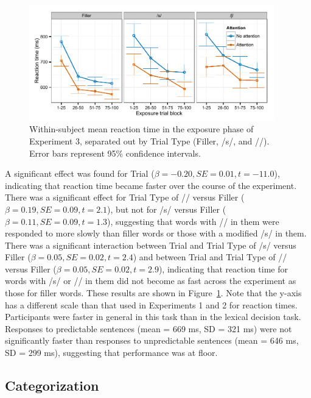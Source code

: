\begin{figure}[!ht]
\centering
\caption{Within-subject mean reaction time in the exposure phase of Experiment 3, separated out by Trial Type (Filler, /s/, and /\textesh/). Error bars represent 95\% confidence intervals.}
\label{fig:exp3exposert}
\begin{center}
\includegraphics[width=0.95\textwidth]{graphs/exp3_exprt}
\end{center}
\end{figure}

A significant effect was found for Trial ($\beta = -0.20, SE = 0.01, t = -11.0$), indicating that reaction time became faster over the course of the experiment.
There was a significant effect for Trial Type of /\textesh/ versus Filler ($\beta = 0.19, SE = 0.09, t = 2.1$), but not for /s/ versus Filler ($\beta = 0.11, SE = 0.09, t = 1.3$), suggesting that words with /\textesh/ in them were responded to more slowly than filler words or those with a modified /s/ in them.
There was a significant interaction between Trial and Trial Type of  /s/ versus Filler ($\beta = 0.05, SE = 0.02, t = 2.4$) and between Trial and Trial Type of /\textesh/ versus Filler ($\beta = 0.05, SE = 0.02, t = 2.9$), indicating that reaction time for words with /s/ or /\textesh/ in them did not become as fast across the experiment as those for filler words.
These results are shown in Figure~\ref{fig:exp3exposert}.
Note that the y-axis has a different scale than that used in Experiments 1 and 2 for reaction times.
Participants were faster in general in this task than in the lexical decision task.
Responses to predictable sentences (mean = 669 ms, SD = 321 ms) were not significantly faster than responses to unpredictable sentences (mean = 646 ms, SD = 299 ms), suggesting that performance was at floor.


\subsection{Categorization}

